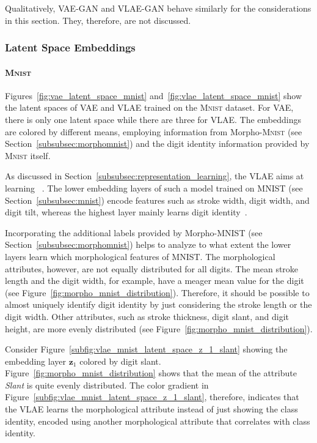 Qualitatively, \ac{VAE}-\ac{GAN} and \ac{VLAE}-\ac{GAN} behave similarly for the considerations in this section.
They, therefore, are not discussed.

\subsubsection{Latent Space Embeddings}\label{subsubsec:latent_space_embeddings}

\paragraph{\textsc{Mnist}}

Figures~\ref{fig:vae_latent_space_mnist} and~\ref{fig:vlae_latent_space_mnist} show the latent spaces of \ac{VAE} and \ac{VLAE} trained on the \textsc{Mnist} dataset.
For \ac{VAE}, there is only one latent space while there are three for \ac{VLAE}.
The embeddings are colored by different means, employing information from Morpho-\textsc{Mnist} (see Section~\ref{subsubsec:morphomnist}) and the digit identity information provided by \textsc{Mnist} itself.

As discussed in Section~\ref{subsubsec:representation_learning}, the \acl{VLAE} aims at learning ~\citep{zhao2017learning}.
The lower embedding layers of such a model trained on MNIST (see Section~\ref{subsubsec:mnist}) encode features such as stroke width, digit width, and digit tilt, whereas the highest layer mainly learns digit identity~\citep{zhao2017learning}.

Incorporating the additional labels provided by Morpho-\textsc{MNIST} (see Section~\ref{subsubsec:morphomnist}) helps to analyze to what extent the lower layers learn which morphological features of \textsc{MNIST}.
The morphological attributes, however, are not equally distributed for all digits.
The mean stroke length and the digit width, for example, have a meager mean value for the digit  (see Figure~\ref{fig:morpho_mnist_distribution}).
Therefore, it should be possible to almost uniquely identify digit  identity by just considering the stroke length or the digit width.
Other attributes, such as stroke thickness, digit slant, and digit height, are more evenly distributed (see Figure~\ref{fig:morpho_mnist_distribution}).

Consider Figure~\ref{subfig:vlae_mnist_latent_space_z_1_slant} showing the embedding layer $\bm{z}_1$ colored by digit slant.
Figure~\ref{fig:morpho_mnist_distribution} shows that the mean of the attribute \textit{Slant} is quite evenly distributed.
The color gradient in Figure~\ref{subfig:vlae_mnist_latent_space_z_1_slant}, therefore, indicates that the VLAE learns the morphological attribute instead of just showing the class identity, encoded using another morphological attribute that correlates with class identity.


